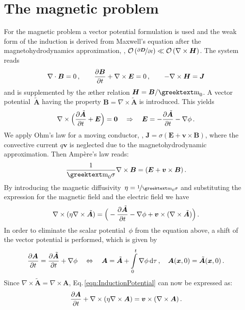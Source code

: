\section{The magnetic problem}
For the magnetic problem a vector potential formulation is used and the weak form of the induction is derived from Maxwell's equation after the magnetohydrodynamics approximation, \ie, $\mathcal{O}\left(\nicefrac{\partial\bm{D}}{\partial t}\right)\ll\mathcal{O}\left(\nabla\times\bm{H}\right)$. The system reads
\begin{equation}
	\nabla\cdot\bm{B}=0\,,\qquad
	\frac{\partial \bm{B}}{\partial t}+\nabla\times\bm{E}=0\,,\qquad
	-\nabla\times\bm{H}=\bm{J}
\end{equation}
and is supplemented by the \ae ther relation $\bm{H}=\bm{B}/\gmu_0$. A vector potential~$\tilde{\bm{A}}$ having the property $\bm{B}=\nabla\times\tilde{\bm{A}}$ is introduced. This yields
\begin{equation}
	\nabla\times\Big(\frac{\partial \tilde{\bm{A}}}{\partial t}+\bm{E}\Big)=\bm{0 \quad }\Rightarrow \quad 
	\bm{E}=-\frac{\partial \tilde{\bm{A}}}{\partial t}-\nabla\phi\,.
\end{equation}
We apply Ohm's law for a moving conductor, \ie, $\bm{J}=\sigma(\bm{E}+\bm{v}\times\bm{B})$, where the convective current $q\bm{v}$ is neglected due to the magnetohydrodynamic approximation. Then Amp\`ere's law reads:
\begin{equation}
	\frac{1}{\gmu_0\sigma}\nabla\times\bm{B}=(\bm{E}+\bm{v}\times\bm{B})\,.
\end{equation}
By introducing the magnetic diffusivity~$\eta=\nicefrac{1}{\gmu_0\sigma}$ and substituting the expression for the magnetic field and the electric field we have
\begin{equation}\label{eqn:InductionPotential}
	\nabla\times(\eta\nabla\times\tilde{\bm{A}})=\Big(-\frac{\partial \tilde{\bm{A}}}{\partial t}-\nabla\phi+\bm{v}\times(\nabla\times\tilde{\bm{A}})\Big)\,.
\end{equation}
In order to eliminate the scalar potential~$\phi$ from the equation above, a shift of the vector potential is performed, which is given by
\begin{equation}
	\frac{\partial \bm{A}}{\partial t}=\frac{\partial \tilde{\bm{A}}}{\partial t}+\nabla\phi \quad \Leftrightarrow \quad 
	\bm{A}=\tilde{\bm{A}}+\int\limits_0^t\nabla\phi\,\mathrm{d}\tau\,,\quad
	\bm{A}(\bm{x},0)=\tilde{\bm{A}}(\bm{x},0)\,.
\end{equation}
Since $\nabla\times\tilde{\bm{A}}=\nabla\times\bm{A}$, Eq.\,\eqref{eqn:InductionPotential} can now be expressed as:
\begin{equation}
	\label{eqn:InductionPotentialMod}
	\frac{\partial \bm{A}}{\partial t}+\nabla\times(\eta\nabla\times\bm{A})=\bm{v}\times(\nabla\times\bm{A})\,.
\end{equation}
